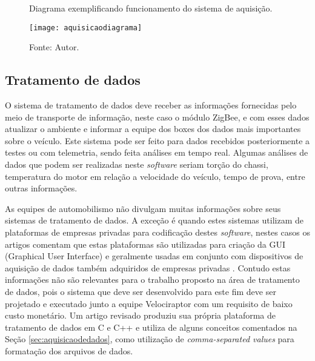 \begin{figure}[!htb]
	\centering
		\caption{Diagrama exemplificando funcionamento do sistema de aquisição.}
		\texttt{[image: aquisicaodiagrama]} 
		\caption*{Fonte: Autor.}
		\label{fig:aquisicaodiagrama}
\end{figure} 


\subsection{Tratamento de dados}

O sistema de tratamento de dados deve receber as informações fornecidas pelo meio de transporte de informação, neste caso o módulo ZigBee, e com esses dados atualizar o ambiente e informar a equipe dos boxes dos dados mais importantes sobre o veículo. Este sistema pode ser feito para dados recebidos posteriormente a testes ou com telemetria, sendo feita análises em tempo real. Algumas análises de dados que podem ser realizadas neste \textit{software} seriam torção do chassi, temperatura do motor em relação a velocidade do veículo, tempo de prova, entre outras informações. 

As equipes de automobilismo não divulgam muitas informações sobre seus sistemas de tratamento de dados. A exceção é quando estes sistemas utilizam de plataformas de empresas privadas para codificação destes \textit{software}, nestes casos os artigos comentam que estas plataformas são utilizadas para criação da GUI (Graphical User Interface) e geralmente usadas em conjunto com dispositivos de aquisição de dados também adquiridos de empresas privadas \cite{applicationOfData2010}\cite{vehicleDataAcquisition2014}\cite{designAndImplementation2015}\cite{developmentOfAn2016}. Contudo estas informações não são relevantes para o trabalho proposto na área de tratamento de dados, pois o sistema que deve ser desenvolvido para este fim deve ser projetado e executado junto a equipe Velociraptor com um requisito de baixo custo monetário. Um artigo revisado produziu sua própria plataforma de tratamento de dados em C e C++ \cite{racecarInstrumentationFor2012} e utiliza de alguns conceitos comentados na Seção \ref{sec:aquisicaodedados}, como utilização de \textit{comma-separated values} para formatação dos arquivos de dados. 

